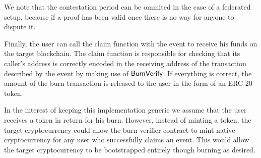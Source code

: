 We note that the contestation period can be ommited in the case of a federated setup, because if a proof has been valid once there is no way for anyone to dispute it.

Finally, the user can call the \textsf{claim} function with the event to receive his funds on the target blockchain. The \textsf{claim} function is responsible for checking that its caller's address is correctly encoded in the receiving address of the transaction described by the event by making use of $\mathsf{BurnVerify}$. If everything is correct, the amount of the burn transaction is released to the user in the form of an ERC-20 token.

In the interest of keeping this implementation generic we assume that the user receives a token in return for his burn. However, instead of minting a token, the target cryptocurrency could allow the burn verifier contract to mint native cryptocurrency for any user who successfully claims an event. This would allow the target cryptocurrency to be bootstrapped entirely though burning as desired.
